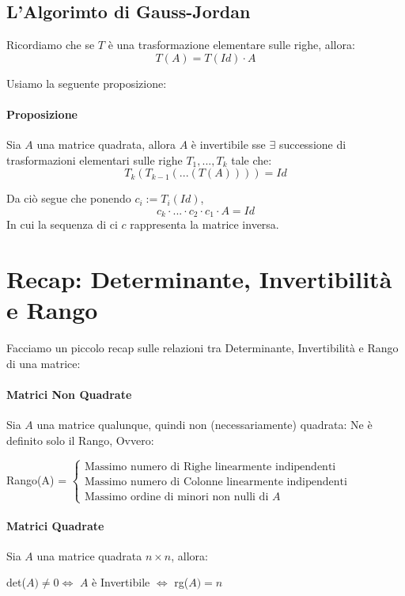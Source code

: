 \subsection{L'Algorimto di Gauss-Jordan}
Ricordiamo che se $T$ è una trasformazione elementare sulle righe, allora:
\[ T(A) = T(Id) \cdot A \]

Usiamo la seguente proposizione:
\paragraph{Proposizione} Sia $A$ una matrice quadrata, allora $A$ è invertibile sse
$\exists$ successione di trasformazioni elementari sulle righe $T_1, ... , T_k$ tale che:
\[ T_k(T_{k-1}(...(T(A))))=Id\]

Da ciò segue che ponendo $c_i := T_i(Id)$,
\[ c_k \cdot ... \cdot c_2 \cdot c_1 \cdot A = Id \]
In cui la sequenza di ci $c$ rappresenta la matrice inversa.

\section{Recap: Determinante, Invertibilità e Rango}
Facciamo un piccolo recap sulle relazioni tra Determinante, Invertibilità e Rango di una matrice:
\paragraph{Matrici Non Quadrate}
Sia $A$ una matrice qualunque, quindi non (necessariamente) quadrata: Ne è definito solo il Rango,
Ovvero:
\begin{center}
	Rango(A) = $\begin{cases}
		\text{Massimo numero di Righe linearmente indipendenti} \\
		\text{Massimo numero di Colonne linearmente indipendenti} \\
		\text{Massimo ordine di minori non nulli di }A
	\end{cases}$
\end{center}

\paragraph{Matrici Quadrate}
Sia $A$ una matrice quadrata $n\times n$, allora:
\begin{center}
	det($A)\neq 0 \Leftrightarrow $ $A$ è Invertibile $\Leftrightarrow$ rg($A)=n$ 
\end{center} 


